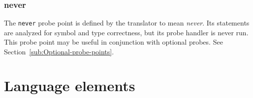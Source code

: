 \documentclass[twoside,english]{article}
\begin{document}
\subsubsection{never}
The \texttt{never} probe point is defined by the translator to mean \emph{never}.
Its statements are analyzed for symbol and type correctness, but its probe
handler is never run. This probe point may be useful in conjunction with
optional probes. See Section~\ref{sub:Optional-probe-points}.


\begin{comment} %
\subsection{Probes to monitor performance}

The perfmon family of probe points is used to access the performance monitoring
hardware available in modern processors. These probe points require perfmon2
support in the kernel to access the hardware.

Performance monitor hardware points have a \texttt{perfmon} prefix. The suffix
names the event being counted, for example \texttt{counter(event)}. The event
names are specific to the processor implementation, except for generic cycle
and instructions events, which are available on all processors. The probe
\texttt{perfmon.counter(event)} starts a counter on the processor which counts
the number of events that occur on that processor. For more details about
the performance monitoring events available on a specific processor, see
the help text returned by typing the perfmon2 command \texttt{pfmon -l.}

\subsubsection{\$counter}

\$counter is a handle used in the body of a probe for operations involving
the counter associated with the probe.

\subsubsection{read\_counter}

read\_counter is a function passed to the handle for a perfmon probe. It
returns the current count for the event.
\end{comment}

\section{Language elements\label{sec:Language-Elements}}
\end{document}
